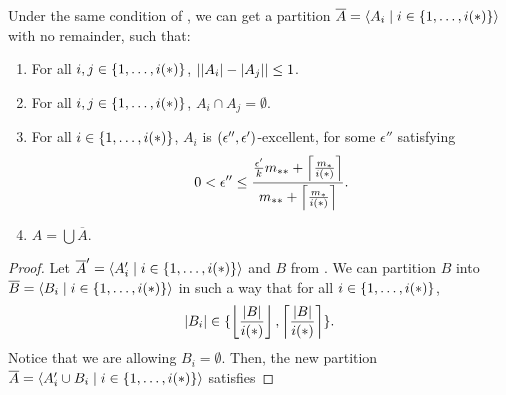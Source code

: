         \begin{lemma} \label{lem:existance_of_excellent_partition_with_equal_size_and_no_remainder}
            Under the same condition of , we can get a
            partition $\overline{A} = \left< A_i \mid i \in \{ 1, \dots, i(*) \} \right>$ with no remainder, such that:
            \begin{enumerate}[label={\Roman*}., ref={\Roman*}, font=\rmfamily]
                \item \label{itm:existance_of_excellent_partition_with_equal_size_and_no_remainder.a}
                    For all $i, j \in \{ 1, \dots, i(*) \}$, $| | A_i |- | A_j | | \leq 1$.
                \item \label{itm:existance_of_excellent_partition_with_equal_size_and_no_remainder.b}
                    For all $i, j \in \{ 1, \dots, i(*) \}$, $A_i \cap A_j = \emptyset$.
                \item \label{itm:existance_of_excellent_partition_with_equal_size_and_no_remainder.c}
                    For all $i \in \{ 1, \dots, i(*) \}$, $A_i$ is $( \epsilon'', \epsilon' )$-excellent, for some $\epsilon''$
                    satisfying
                    \[
                        0 < \epsilon'' \leq \frac{\frac{\epsilon'}{k} m_{**} + \left\lceil \frac{m_*}{i(*)} \right\rceil}{m_{**} + \left\lceil \frac{m_*}{i(*)} \right\rceil}.
                    \]
                \item \label{itm:existance_of_excellent_partition_with_equal_size_and_no_remainder.d} $A = \bigcup \overline{A}$.
            \end{enumerate}
            \begin{proof}
                Let $\overline{A}' = \left< A_i' \mid i \in \{ 1, \dots, i(*) \} \right>$ and $B$ from
                .
                \sloppy We can partition $B$ into \mbox{$\overline{B} = \left< B_i \mid i \in \{ 1, \dots, i(*) \} \right>$}
                in such a way that for all $i \in \{ 1, \dots, i(*) \}$,
                \[
                    |B_i| \in \{ \left\lfloor \frac{| B |}{i(*)} \right\rfloor, \left\lceil \frac{| B |}{i(*)} \right\rceil \}.
                \]
                Notice that we are allowing $B_i = \emptyset$.
                Then, the new partition $\overline{A} = \left< A_i' \cup B_i \mid i \in \{ 1, \dots, i(*) \} \right>$ satisfies

\end{proof}
\end{lemma}

